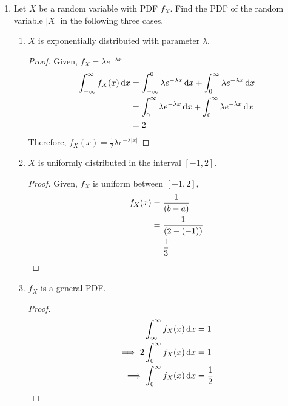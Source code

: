 \documentclass[paper=usletter, fontsize=12pt]{article}
\begin{document}

    \begin{enumerate}

        \item Let $X$ be a random variable with PDF $f_X$. Find the PDF of the
        random variable $|X|$ in the following three cases.
        \begin{enumerate}

            \item $X$ is exponentially distributed with parameter $\lambda$.
            \begin{proof}

                Given, $f_X=\lambda e^{-\lambda x}$
                \begin{align*}
                    \int_{-\infty}^{\infty}f_X(x)\mathop{}\!\mathrm{d}{x} & = \int_{-\infty}^{0}\lambda e^{-\lambda x}\mathop{}\!\mathrm{d}{x} + \int_{0}^{\infty}\lambda e^{-\lambda x}\mathop{}\!\mathrm{d}{x} \\
                    & = \int_{0}^{\infty}\lambda e^{-\lambda x}\mathop{}\!\mathrm{d}{x} + \int_{0}^{\infty}\lambda e^{-\lambda x}\mathop{}\!\mathrm{d}{x} \\
                    & = 2
                \end{align*}
                Therefore, $f_X(x) = \frac{1}{2}\lambda e^{-\lambda |x|}$ \qedhere

            \end{proof}

            \item $X$ is uniformly distributed in the interval $[-1,2]$.
            \begin{proof}

                Given, $f_X$ is uniform between $[-1,2]$,
                \begin{align*}
                    f_X(x) & = \frac{1}{(b-a)} \\
                    & = \frac{1}{(2 - (-1))} \\
                    & = \frac{1}{3} \qedhere
                \end{align*}
                \endgroup

            \end{proof}

            \item $f_X$ is a general PDF.
            \begin{proof}

                \begin{align*}
                    \int_{\infty}^{\infty}f_X(x)\mathop{}\!\mathrm{d}{x} & = 1 \\
                    \implies 2\int_{0}^{\infty}f_X(x)\mathop{}\!\mathrm{d}{x} & = 1 \\
                    \implies \int_{0}^{\infty}f_X(x)\mathop{}\!\mathrm{d}{x} & = \frac{1}{2} \qedhere
                \end{align*}


\end{proof}
\end{enumerate}
\end{enumerate}
\end{document}
